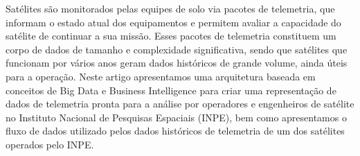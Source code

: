 
\begin{resumo}


\hypertarget{estilo:resumo}{} %

Satélites são monitorados pelas equipes de solo via pacotes de telemetria, que informam o estado atual dos equipamentos e permitem avaliar a capacidade do satélite de continuar a sua missão.
Esses pacotes de telemetria constituem um corpo de dados de tamanho e complexidade significativa, sendo que satélites que funcionam por vários anos geram dados históricos de grande volume, ainda úteis para a operação.
Neste artigo apresentamos uma arquitetura baseada em conceitos de Big Data e Business Intelligence para criar uma representação de dados de telemetria pronta para a análise por operadores e engenheiros de satélite no Instituto Nacional de Pesquisas Espaciais (INPE), bem como apresentamos o fluxo de dados utilizado pelos dados históricos de telemetria de um dos satélites operados pelo INPE.

 
\end{resumo}
